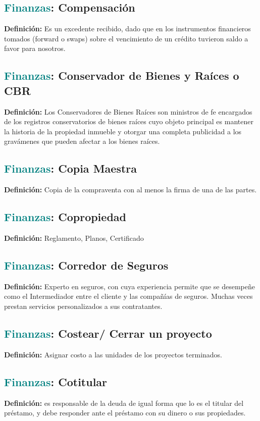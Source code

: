 \documentclass[12pt]{article}
\begin{document}
\subsection{\textcolor{teal}{Finanzas}: Compensación}
\textbf{Definición:} Es un excedente recibido, dado que en los instrumentos financieros tomados (forward o swaps) sobre el vencimiento de un crédito tuvieron saldo a favor para nosotros.
\subsection{\textcolor{teal}{Finanzas}: Conservador de Bienes y Raíces o CBR}
\textbf{Definición:} Los Conservadores de Bienes Raíces son ministros de fe encargados de los registros conservatorios de bienes raíces cuyo objeto principal es mantener la historia de la propiedad inmueble y otorgar una completa publicidad a los gravámenes que pueden afectar a los bienes raíces.
\subsection{\textcolor{teal}{Finanzas}: Copia Maestra}
\textbf{Definición:} Copia de la compraventa con al menos la firma de una de las partes.
\subsection{\textcolor{teal}{Finanzas}: Copropiedad}
\textbf{Definición:} Reglamento, Planos, Certificado
\subsection{\textcolor{teal}{Finanzas}: Corredor de Seguros}
\textbf{Definición:} Experto en seguros, con cuya experiencia permite que se desempeñe como el Intermediador entre el cliente y las compañías de seguros. Muchas veces prestan servicios personalizados a sus contratantes.
\subsection{\textcolor{teal}{Finanzas}: Costear/ Cerrar un proyecto}
\textbf{Definición:} Asignar costo a las unidades de los proyectos terminados.
\subsection{\textcolor{teal}{Finanzas}: Cotitular}
\textbf{Definición:} es responsable de la deuda de igual forma que lo es el titular del préstamo, y debe responder ante el préstamo con su dinero o sus propiedades.
\end{document}
